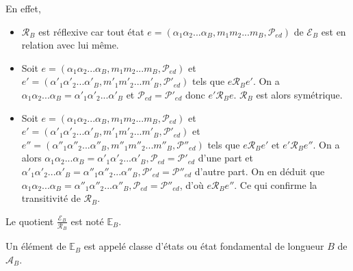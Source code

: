 \begin{Pre}
En effet, 
\begin{itemize}
\item $\mathcal{R}_{B}$ est réflexive  car tout état $e=(\alpha_{1}\alpha_{2}...\alpha_{B},m_{1}m_{2}...m_{B},\mathcal{P}_{ed}) $ de $\mathcal{E}_{B}$ est en relation avec lui même.

\item Soit $e=(\alpha_{1}\alpha_{2}...\alpha_{B},m_{1}m_{2}...m_{B},\mathcal{P}_{ed})$ et $e'=(\alpha'_{1}\alpha'_{2}...\alpha'_{B},m'_{1}m'_{2}...m'_{B},\mathcal{P}'_{ed})$ tels que $e\mathcal{R}_{B} e'$. On a  $\alpha_{1}\alpha_{2}...\alpha_{B}=\alpha'_{1}\alpha'_{2}...\alpha'_{B}$ et $\mathcal{P}_{ed}= \mathcal{P}'_{ed}$ donc $e'\mathcal{R}_{B} e$. $\mathcal{R}_{B}$ est alors symétrique.

\item Soit $e=(\alpha_{1}\alpha_{2}...\alpha_{B},m_{1}m_{2}...m_{B},\mathcal{P}_{ed})$ et $e'=(\alpha'_{1}\alpha'_{2}...\alpha'_{B},m'_{1}m'_{2}...m'_{B},\mathcal{P}'_{ed})$ et $e''=(\alpha''_{1}\alpha''_{2}...\alpha''_{B},m''_{1}m''_{2}...m''_{B},\mathcal{P}''_{ed})$ tels que $e\mathcal{R}_{B} e'$ et  $e'\mathcal{R}_{B} e''$. On a alors $\alpha_{1}\alpha_{2}...\alpha_{B}=\alpha'_{1}\alpha'_{2}...\alpha'_{B}, \mathcal{P}_{ed}=\mathcal{P}'_{ed}$ d'une part et  $\alpha'_{1}\alpha'_{2}...\alpha'_{B}=\alpha''_{1}\alpha''_{2}...\alpha''_{B}, \mathcal{P}'_{ed}=\mathcal{P}''_{ed}$ d'autre part. On en déduit que $\alpha_{1}\alpha_{2}...\alpha_{B}=\alpha''_{1}\alpha''_{2}...\alpha''_{B}, \mathcal{P}_{ed}=\mathcal{P}''_{ed}$, d'où $e \mathcal{R}_{B} e''$. Ce qui confirme la transitivité de $\mathcal{R}_{B}$.
\end{itemize} 
Le quotient  $\frac{\mathcal{E}_{B}}{\mathcal{R}_{B}}$ est noté $\mathbb{E}_{B}$.
\end{Pre}
\begin{Def}\label{defAt6}

Un élément de  $\mathbb{E}_{B}$ est appelé classe d'états ou état fondamental de longueur $B$ de $\mathcal{A}_{B}$.
\end{Def}

